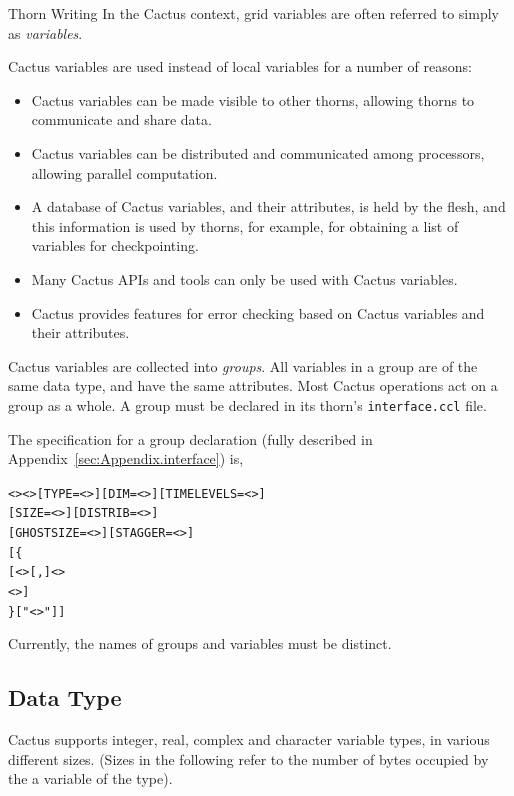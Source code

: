 \begin{cactuspart}{Thorn Writing}
In the Cactus context, grid variables are often referred
to simply as \textit{variables}.

Cactus variables are used instead of local variables for a number of reasons:
\begin{itemize}
\item Cactus variables can be made visible to other thorns, allowing
      thorns to communicate and share data.
\item Cactus variables can be distributed and communicated
      among processors, allowing parallel computation.
\item A database of Cactus variables, and their attributes, is held by
      the flesh, and this information is used by thorns, for example, for
      obtaining a list of variables for checkpointing.
\item Many Cactus APIs and tools can only be used with Cactus variables.
\item Cactus provides features for error checking based on Cactus variables
      and their attributes.
\end{itemize}

Cactus variables are collected into \textit{groups}.  All variables in a
group are of the same data type, and have the same attributes. Most Cactus
operations act on a group as a whole.  A group must be declared in its
thorn's \texttt{interface.ccl} file.

The specification for a group declaration
(fully described in Appendix~\ref{sec:Appendix.interface}) is,

\begin{alltt}
<> <> [TYPE=<>] [DIM=<>] [TIMELEVELS=<>]
   [SIZE=<>] [DISTRIB=<>]
   [GHOSTSIZE=<>] [STAGGER=<>]
[\{
 [ <>[,]<>
   <> ]
\} ["<>"] ]
\end{alltt}

Currently, the names of groups and variables must be distinct.


\subsection{Data Type}

Cactus supports integer, real, complex and character variable types, in
various different sizes.  (Sizes in the following refer to the number of
bytes occupied by the a variable of the type).


\end{cactuspart}
